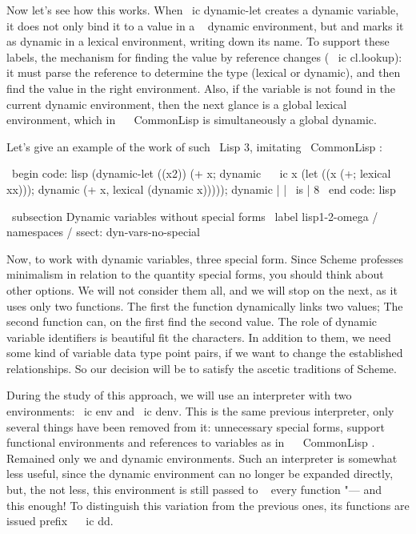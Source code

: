 Now let's see how this works. When \ ic {dynamic-let} creates a dynamic
variable, it does not only bind it to a value in a ~ dynamic environment, but
and marks it as dynamic in a lexical environment, writing down its name.
To support these labels, the mechanism for finding the value by reference changes
( \ ic {cl.lookup}): it must parse the reference to determine the type
(lexical or dynamic), and then find the value
in the right environment. Also, if the variable is not found in the current dynamic
environment, then the next glance is a global lexical environment,
which in ~ { \ CommonLisp } is simultaneously a global dynamic.

Let's give an example of the work of such \ Lisp 3, imitating { \ CommonLisp }:

\ begin {code: lisp}
(dynamic-let ((x2))
  (+ x; dynamic ~ \ ic {x}
     (let ((x (+; lexical
                 xx))); dynamic
       (+ x, lexical
          (dynamic x))))); dynamic
| | \ is | 8
\ end {code: lisp}


\ subsection {Dynamic variables without special forms} %
\ label {lisp1-2-omega / namespaces / ssect: dyn-vars-no-special}

Now, to work with dynamic variables, three special
form. Since Scheme professes minimalism in relation to the quantity
special forms, you should think about other options. We will not consider them
all, and we will stop on the next, as it uses only two functions. The first
the function dynamically links two values; The second function can, on the first
find the second value. The role of dynamic variable identifiers is beautiful
fit the characters. In addition to them, we need some kind of variable data type
point pairs, if we want to change the established relationships. So our decision will be
to satisfy the ascetic traditions of Scheme.

During the study of this approach, we will use an interpreter with two
environments: \ ic {env} and \ ic {denv}. This is the same previous interpreter, only
several things have been removed from it: unnecessary special forms, support
functional environments and references to variables as in ~ { \ CommonLisp }. Remained
only we and dynamic environments. Such an interpreter is somewhat less useful,
since the dynamic environment can no longer be expanded directly, but, the
not less, this environment is still passed to ~ every function "--- and ~ this
enough! To distinguish this variation from the previous ones, its functions are issued
prefix ~ \ ic {dd}.

